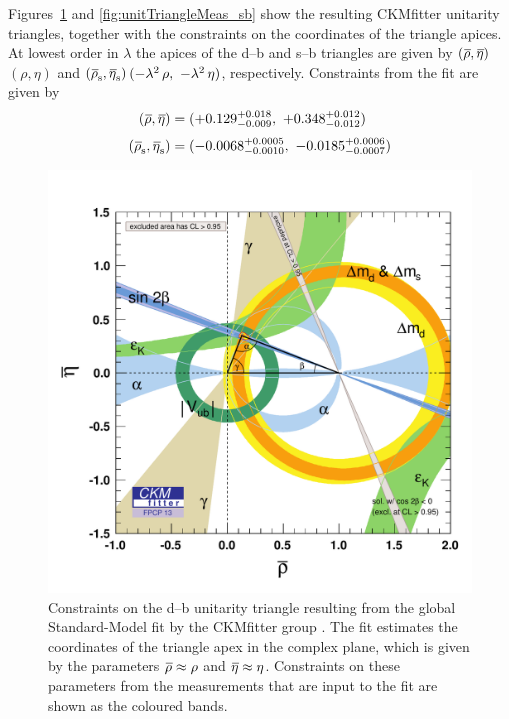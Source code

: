 Figures~\ref{fig:unitTriangleMeas_db} and \ref{fig:unitTriangleMeas_sb} show the resulting CKMfitter unitarity triangles, together with the
constraints on the coordinates of the triangle apices. At lowest order in $\lambda$ the apices of the d--b and s--b triangles are given by
$(\rhobar, \etabar)$\textapprox$(\rho, \eta)$ and $(\rhosbar, \etasbar)$\textapprox$(-\lambda^2\,\rho,\ -\lambda^2\,\eta)$, respectively.
Constraints from the fit are given by
\begin{equation}
  \label{eq:CKMApicesCKMf}
  \begin{aligned}
    (\rhobar, \etabar)   &= (+0.129^{+0.018}_{-0.009},\ +0.348^{+0.012}_{-0.012}) \\[0.3em]
    (\rhosbar, \etasbar) &= (-0.0068^{+0.0005}_{-0.0010},\ -0.0185^{+0.0006}_{-0.0007})
  \end{aligned}
\end{equation}

\begin{figure}[htbp]
  \centering
  \includegraphics[trim=5mm 2mm 3mm 15mm, clip=true, width=\textwidth]{graphics/intro/rhoeta_large_CMYK}
  \caption{Constraints on the d--b unitarity triangle resulting from the global Standard-Model fit by the CKMfitter group
           \cite{Charles:2004jd}. The fit estimates the coordinates of the triangle apex in the complex plane, which is given by the
	   parameters $\rhobar\approx\rho$ and $\etabar\approx\eta$.
           Constraints on these parameters from the measurements that are input to the fit are shown as the coloured bands.}
  \label{fig:unitTriangleMeas_db}
\end{figure}

